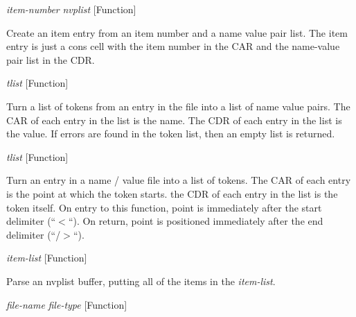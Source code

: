 \vspace{1em}
\noindent
{}
\usebox{\funcname}\emph{item-number} \emph{nvplist}
 \hfill [Function]

\begin{doc-string}
Create an item entry from an item number and a name value pair list.
The item entry is just a cons cell with the item number in the CAR and the
name-value pair list in the CDR.
\end{doc-string}

\vspace{1em}
\noindent
{}
\usebox{\funcname}\emph{tlist}
 \hfill [Function]

\begin{doc-string}
Turn a list of tokens from an entry in the file into a list of name value pairs.  The
CAR of each entry in the list is the name.  The CDR of each entry in the list is the value.  If
errors are found in the token list, then an empty list is returned.
\end{doc-string}

\vspace{1em}
\noindent
{}
\usebox{\funcname}\emph{tlist}
 \hfill [Function]

\begin{doc-string}
Turn an entry in a name / value file into a list of tokens.  The CAR of each entry is the point
at which the token starts.  the CDR of each entry in the list is the token itself.  On entry
to this function, point is immediately after the start delimiter (``$<$``).  On return, point
is positioned immediately after the end delimiter (``/$>$``).
\end{doc-string}

\vspace{1em}
\noindent
{}
\usebox{\funcname}\emph{item-list}
 \hfill [Function]

\begin{doc-string}
Parse an nvplist buffer, putting all of the items in the \emph{item-list}.
\end{doc-string}

\vspace{1em}
\noindent
{}
\usebox{\funcname}\emph{file-name} \emph{file-type}
 \hfill [Function]
\hspace*{\wd\funcname}


